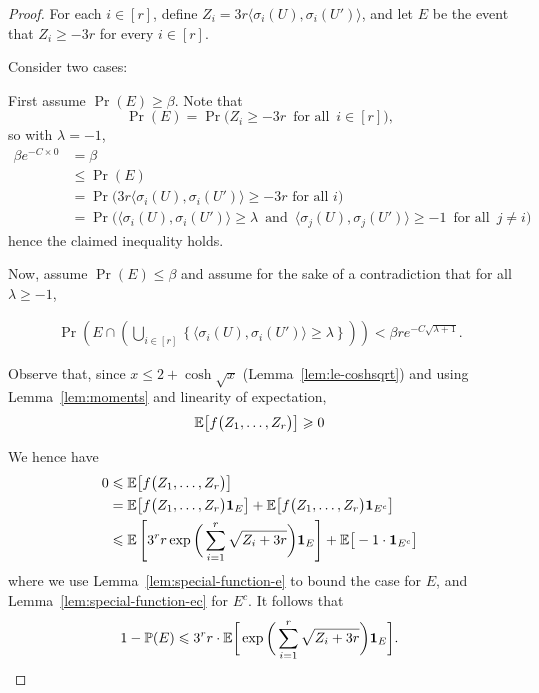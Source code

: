 \begin{proof}
  For each $i \in [r]$, define $Z_i = 3r\big\langle \sigma_i(U),\sigma_i(U') \big\rangle$, and let $E$ be the event that $Z_i \ge -3r$ for every $i \in [r]$.

  Consider two cases:

  First assume $\Pr(E) \ge \beta$. Note that
  $$\Pr(E) = \Pr\Big( Z_i \ge - 3r \, \text{ for all } \, i \in [r] \Big),$$
  so with $\lambda = -1$,
  \begin{align*}
    \beta e^{-C\times 0} &= \beta\\
    &\le \Pr(E)\\
    &= \Pr\Big(3r\big\langle \sigma_i(U),\sigma_i(U') \big\rangle \ge -3r \text{ for all }i\Big)\\
    &= \Pr\Big( \big\langle \sigma_i(U),\sigma_i(U') \big\rangle \ge \lambda \, \text{ and } \, \big\langle \sigma_j(U), \sigma_j(U') \big\rangle \ge -1 \, \text{ for all } \, j \ne i \Big)
  \end{align*}
  hence the claimed inequality holds.

  Now, assume $\Pr(E) \le \beta$ and assume for the sake of a contradiction that for all $\lambda \geq -1$,

  \begin{align}\label{eq:max:big:and:E:no}
    \Pr\left(E \cap \left( \bigcup_{i \in [r]} \left\{ \big\langle \sigma_i(U),\sigma_i(U') \big\rangle \ge \lambda \right\}\right)\right) < \beta r e^{-C\sqrt{\lambda + 1}}.
  \end{align}

  Observe that, since $x \le 2 + \cosh\sqrt{x}$ (Lemma~\ref{lem:le-coshsqrt}) and using Lemma~\ref{lem:moments} and linearity of expectation,
  \[
    \mathbb{E}\big[ f\big( Z_1,\ldots,Z_r \big) \big] \geqslant 0
  \]

  We hence have
  \begin{align*}
    0 &\leqslant \mathbb{E}\big[ f\big( Z_1,\ldots,Z_r \big) \big]\\
    &= \mathbb{E}\big[ f\big( Z_1,\ldots,Z_r \big)  \mathbf{1}_E \big] + \mathbb{E}\big[ f\big( Z_1,\ldots,Z_r \big) \mathbf{1}_{E^c} \big]\\
    &\leqslant \mathbb{E}\left[ 3^r r \exp\bigg( \displaystyle\sum_{i = 1}^r \sqrt{ Z_i + 3r } \bigg)  \mathbf{1}_E \right] + \mathbb{E}\big[-1 \cdot \mathbf{1}_{E^c} \big]
  \end{align*}
  where we use Lemma~\ref{lem:special-function-e} to bound the case for $E$, and Lemma~\ref{lem:special-function-ec} for $E^c$.
  It follows that
  \begin{equation}\label{eq:eventE:inequality}
    1 - \mathbb{P}(E) \leqslant 3^r r \cdot \mathbb{E}\bigg[ \exp\bigg( \sum_{i = 1}^r \sqrt{ Z_i + 3r } \bigg) \mathbf{1}_E \bigg].
  \end{equation}


\end{proof}
